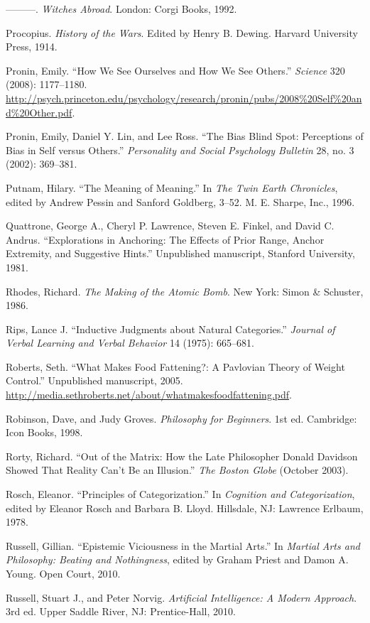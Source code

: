 \documentclass[letterpaper]{book}
\begin{document}
{
 {}---{}---{}---. \textit{Witches Abroad}. London: Corgi Books,
1992.}

{
 Procopius. \textit{History of the Wars}. Edited by Henry B.
Dewing. Harvard University Press, 1914.}

{
 Pronin, Emily. ``How We See Ourselves and How We
See Others.'' \textit{Science} 320 (2008):
1177--1180.
\url{http://psych.princeton.edu/psychology/research/pronin/pubs/2008\%20Self\%20and\%20Other.pdf}.}

{
 Pronin, Emily, Daniel Y. Lin, and Lee Ross. ``The
Bias Blind Spot: Perceptions of Bias in Self versus
Others.'' \textit{Personality and Social Psychology
Bulletin} 28, no. 3 (2002): 369--381.}

{
 Putnam, Hilary. ``The Meaning of
Meaning.'' In \textit{The Twin Earth Chronicles},
edited by Andrew Pessin and Sanford Goldberg, 3--52. M. E. Sharpe,
Inc., 1996.}

{
 Quattrone, George A., Cheryl P. Lawrence, Steven E. Finkel, and
David C. Andrus. ``Explorations in Anchoring: The
Effects of Prior Range, Anchor Extremity, and Suggestive
Hints.'' Unpublished manuscript, Stanford University,
1981.}

{
 Rhodes, Richard. \textit{The Making of the Atomic Bomb}. New York:
Simon \& Schuster, 1986.}

{
 Rips, Lance J. ``Inductive Judgments about
Natural Categories.'' \textit{Journal of Verbal
Learning and Verbal Behavior} 14 (1975): 665--681.}

{
 Roberts, Seth. ``What Makes Food Fattening?: A
Pavlovian Theory of Weight Control.'' Unpublished
manuscript, 2005.
\url{http://media.sethroberts.net/about/whatmakesfoodfattening.pdf}.}

{
 Robinson, Dave, and Judy Groves. \textit{Philosophy for
Beginners}. 1st ed. Cambridge: Icon Books, 1998.}

{
 Rorty, Richard. ``Out of the Matrix: How the Late
Philosopher Donald Davidson Showed That Reality Can't
Be an Illusion.'' \textit{The Boston Globe} (October
2003).}

{
 Rosch, Eleanor. ``Principles of
Categorization.'' In \textit{Cognition and
Categorization}, edited by Eleanor Rosch and Barbara B. Lloyd.
Hillsdale, NJ: Lawrence Erlbaum, 1978.}

{
 Russell, Gillian. ``Epistemic Viciousness in the
Martial Arts.'' In \textit{Martial Arts and
Philosophy: Beating and Nothingness}, edited by Graham Priest and Damon
A. Young. Open Court, 2010.}

{
 Russell, Stuart J., and Peter Norvig. \textit{Artificial
Intelligence: A Modern Approach}. 3rd ed. Upper Saddle River, NJ:
Prentice-Hall, 2010.}
\end{document}
